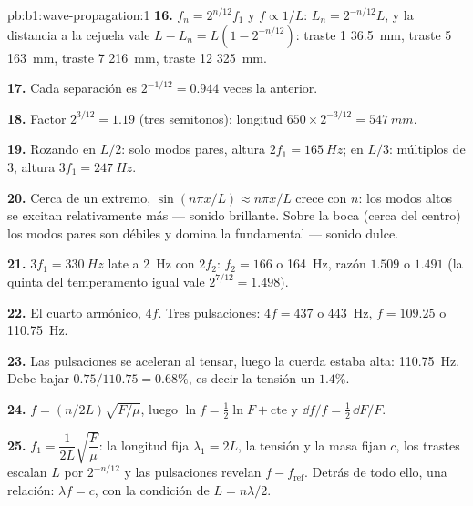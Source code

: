 \begin{solution}{pb:b1:wave-propagation:1}
\textbf{16.} $f_n = 2^{n/12}f_1$ y $f \propto 1/L$: $L_n = 2^{-n/12}L$, y
la distancia a la cejuela vale $L - L_n = L(1 - 2^{-n/12})$: traste 1
\qty{36.5}{mm}, traste 5 \qty{163}{mm}, traste 7 \qty{216}{mm}, traste 12
\qty{325}{mm}.

\textbf{17.} Cada separación es $2^{-1/12} = 0.944$ veces la anterior.

\textbf{18.} Factor $2^{3/12} = 1.19$ (tres semitonos); longitud
$650 \times 2^{-3/12} = \qty{547}{mm}$.

\textbf{19.} Rozando en $L/2$: solo modos pares, altura $2f_1 =
\qty{165}{Hz}$; en $L/3$: múltiplos de $3$, altura $3f_1 = \qty{247}{Hz}$.

\textbf{20.} Cerca de un extremo, $\sin(n\pi x/L) \approx n\pi x/L$ crece
con $n$: los modos altos se excitan relativamente más --- sonido
brillante. Sobre la boca (cerca del centro) los modos pares son débiles y
domina la fundamental --- sonido dulce.

\textbf{21.} $3f_1 = \qty{330}{Hz}$ late a \qty{2}{Hz} con $2f_2$:
$f_2 = 166$ o \qty{164}{Hz}, razón $1.509$ o $1.491$ (la quinta del
temperamento igual vale $2^{7/12} = 1.498$).

\textbf{22.} El cuarto armónico, $4f$. Tres pulsaciones: $4f = 437$ o
\qty{443}{Hz}, $f = 109.25$ o \qty{110.75}{Hz}.

\textbf{23.} Las pulsaciones se aceleran al tensar, luego la cuerda estaba
alta: \qty{110.75}{Hz}. Debe bajar $0.75/110.75 = 0.68\%$, es decir la
tensión un $1.4\%$.

\textbf{24.} $f = (n/2L)\sqrt{F/\mu}$, luego $\ln f = \tfrac12\ln F + \text{cte}$
y $\dd f/f = \tfrac12\,\dd F/F$.

\textbf{25.} $f_1 = \dfrac{1}{2L}\sqrt{\dfrac{F}{\mu}}$: la longitud fija
$\lambda_1 = 2L$, la tensión y la masa fijan $c$, los trastes escalan $L$
por $2^{-n/12}$ y las pulsaciones revelan $f - f_{\text{ref}}$. Detrás de
todo ello, una relación: $\lambda f = c$, con la condición de  $L = n\lambda/2$.
\end{solution}
